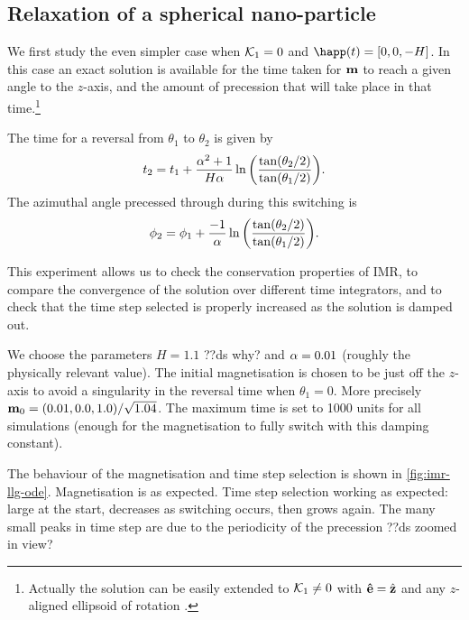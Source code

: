 \subsection{Relaxation of a spherical nano-particle}

We first study the even simpler case when $\mathcal{K}_1 = 0$ and $\happ(t) = [0, 0, -H]$.
In this case an exact solution is available for the time taken for $\mathbf{m}$ to reach a given angle to the $z$-axis, and the amount of precession that will take place in that time.\footnote{Actually the solution can be easily extended to $\mathcal{K}_1 \neq 0$ with $\mathbf{\hat{e}} = {\hat{\mathbf{z}}}$ and any $z$-aligned ellipsoid of rotation \cite{Mallinson2000}.}

The time for a reversal from $\theta_1$ to $\theta_2$ is given by
\begin{equation}
  t_2 = t_1 + \frac{\alpha^2 +1}{H \alpha}
  \ln {\left(  \frac{\tan(\theta_2/2)}{\tan(\theta_1/2)}  \right)}.
\end{equation}
The azimuthal angle precessed through during this switching is
\begin{equation}
  \phi_2 = \phi_1 +  \frac{-1}{\alpha} \ln {\left(  \frac{\tan(\theta_2/2)}{\tan(\theta_1/2)}  \right)}.
\end{equation}

This experiment allows us to check the conservation properties of IMR, to compare the convergence of the solution over different time integrators, and to check that the time step selected is properly increased as the solution is damped out.

We choose the parameters $H = 1.1$ ??ds why? and $\alpha = 0.01$ (roughly the physically relevant value). The initial magnetisation is chosen to be just off the $z$-axis to avoid a singularity in the reversal time when $\theta_1 = 0$. More precisely $\mathbf{m}_0 = (0.01, 0.0, 1.0)/\sqrt{1.04}$. The maximum time is set to 1000 units for all simulations (enough for the magnetisation to fully switch with this damping constant).

The behaviour of the magnetisation and time step selection is shown in \autoref{fig:imr-llg-ode}.
Magnetisation is as expected.
Time step selection working as expected: large at the start, decreases as switching occurs, then grows again. 
The many small peaks in time step are due to the periodicity of the precession ??ds zoomed in view?

